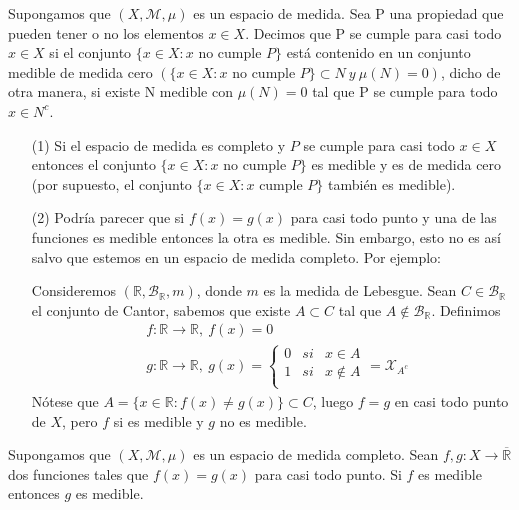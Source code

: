 \begin{defi}
    Supongamos que $(X, \mathcal{M}, \mu)$ es un espacio de medida. Sea P una propiedad que pueden tener o no los elementos $x \in X$. Decimos que P se cumple para casi todo $x \in X$ si el conjunto $\{ x \in X : x \text{ no cumple } P \}$ está contenido en un conjunto medible de medida cero $(\{ x \in X : x \text{ no cumple } P \} \subset N \ y \ \mu(N) = 0)$, dicho de otra manera, si existe N medible con $\mu(N) = 0$ tal que P se cumple para todo $x \in N^c$.
\end{defi}

\begin{obs}
    \begin{enumerate}
        \item[(1)] Si el espacio de medida es completo y $P$ se cumple para casi todo $x \in X$ entonces el conjunto $\{ x \in X : x \text{ no cumple } P \}$ es medible y es de medida cero (por supuesto, el conjunto $\{ x \in X : x \text{ cumple } P \}$ también es medible).
        \item[(2)] Podría parecer que si $f(x) = g(x)$ para casi todo punto y una de las funciones es medible entonces la otra es medible. Sin embargo, esto no es así salvo que estemos en un espacio de medida completo. Por ejemplo:

              Consideremos $(\mathbb{R}, \mathcal{B}_{\mathbb{R}}, m)$, donde $m$ es la medida de Lebesgue. Sean $C \in \mathcal{B}_{\mathbb{R}}$ el conjunto de Cantor, sabemos que existe $A \subset C$ tal que $A \not \in \mathcal{B}_{\mathbb{R}}$. Definimos
              \begin{align*}
                   & f: \mathbb{R} \longrightarrow \mathbb{R}, \ f(x) = 0                              \\
                   & g: \mathbb{R} \longrightarrow \mathbb{R}, \ g(x) = \left\{ \begin{array}{lcc}
                                                                                    0 & si & x \in A       \\
                                                                                    1 & si & x \not \in  A \\
                                                                                \end{array}
                  \right.
                  = \mathcal{X}_{A^c}
              \end{align*}
              Nótese que $A = \{ x \in \mathbb{R} : f(x) \not = g(x)\} \subset C$, luego $f = g$ en casi todo punto de $X$, pero $f$ si es medible y $g$ no es medible.
    \end{enumerate}
\end{obs}
\begin{prop}
    Supongamos que $(X, \mathcal{M}, \mu)$ es un espacio de medida completo. Sean $f,g: X \longrightarrow \overline{\mathbb{R}}$ dos funciones tales que $f(x) = g(x)$ para casi todo punto. Si $f$ es medible entonces $g$ es medible.
\end{prop}


